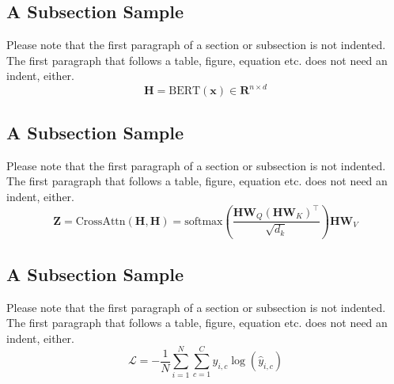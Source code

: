 



\subsection{A Subsection Sample}
Please note that the first paragraph of a section or subsection is
not indented. The first paragraph that follows a table, figure,
equation etc. does not need an indent, either.
\begin{equation}
    \mathbf{H} = \text{BERT}(\mathbf{x}) \in \mathbf{R}^{n \times d}
    \label{eq:encoder}
\end{equation}



\subsection{A Subsection Sample}
Please note that the first paragraph of a section or subsection is
not indented. The first paragraph that follows a table, figure,
equation etc. does not need an indent, either.
\begin{equation}
    \mathbf{Z} = \text{CrossAttn}(\mathbf{H}, \mathbf{H}) = \text{softmax}\left(\frac{\mathbf{H} \mathbf{W}_Q (\mathbf{H} \mathbf{W}_K)^\top}{\sqrt{d_k}}\right) \mathbf{H} \mathbf{W}_V
    \label{eq:crossattn}
\end{equation}


\subsection{A Subsection Sample}
Please note that the first paragraph of a section or subsection is
not indented. The first paragraph that follows a table, figure,
equation etc. does not need an indent, either.
\begin{equation}
    \mathcal{L} = -\frac{1}{N} \sum_{i=1}^{N} \sum_{c=1}^{C} y_{i,c} \log(\hat{y}_{i,c})
    \label{eq:loss}
\end{equation}